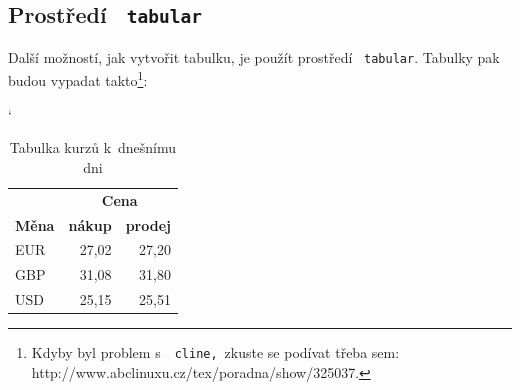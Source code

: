 \documentclass[11pt,a4paper]{article}
\begin{document}
\subsection{Prostředí \ \texttt{tabular}}
Další možností, jak vytvořit tabulku, je použít prostředí \ \texttt{tabular}. Tabulky pak budou vypadat takto\footnote{Kdyby byl problem s~\ \texttt{cline,}\  zkuste se podívat třeba sem: http://www.abclinuxu.cz/tex/poradna/show/325037.\vspace*{\fill} \pagebreak }:
\bigskip
\begin{table}[h]
\begin{center}
\catcode` 
\begin{tabular}{|l|r|r|} \hline
& \multicolumn{2}{|c|}{\bfseries Cena}
\\ \cline{2-3}
\bfseries Měna & \bfseries nákup & \bfseries prodej \\ \hline
EUR & 27,02 & 27,20 \\
GBP & 31,08 & 31,80 \\
USD & 25,15 & 25,51 \\ \hline
\end{tabular}
\caption{Tabulka kurzů k~dnešnímu dni}
\label{tab:kurzy}
\end{center}
\end{table}
\end{document}
